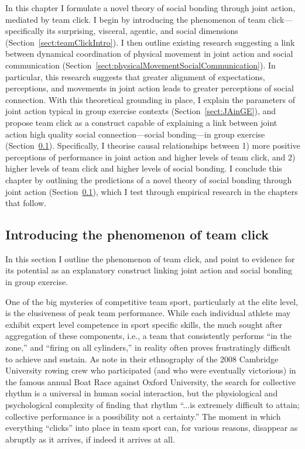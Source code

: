 \begin{CJK}{UTF8}{gbsn}
In this chapter I formulate a novel theory of social bonding through joint action, mediated by team click.  I begin by introducing the phenomenon of team click---specifically its surprising, visceral, agentic, and social dimensions (Section~\ref{sect:teamClickIntro}).  I then outline existing research suggesting a link between dynamical coordination of physical movement in joint action and social communication (Section~\ref{sect:physicalMovementSocialCommunication}). In particular, this research suggests that greater alignment of expectations, perceptions, and movements in joint action leads to greater perceptions of social connection.  With this theoretical grounding in place, I explain the parameters of joint action typical in group exercise contexts (Section~\ref{sect:JAinGE}), and propose team click as a construct capable of explaining a link between joint action high quality social connection---social bonding---in group exercise (Section~\ref{}).  Specifically, I theorise causal relationships between 1) more positive perceptions of performance in joint action and higher levels of team click, and 2) higher levels of team click and higher levels of social bonding.  I conclude this chapter by outlining the predictions of a novel theory of social bonding through joint action (Section~\ref{}), which I test through empirical research in the chapters that follow.


\subsection{Introducing the phenomenon of team click \label{sect:teamClickIntro}}
In this section I outline the phenomenon of team click, and point to evidence for its potential as an explanatory construct linking joint action and social bonding in group exercise.

One of the big mysteries of competitive team sport, particularly at the elite level, is the elusiveness of peak team performance.  While each individual athlete may exhibit expert level competence in sport specific skills, the much sought after aggregation of these components, i.e., a team that consistently performs ``in the zone,'' and ``firing on all cylinders,'' in reality often proves frustratingly difficult to achieve and sustain.  As \textcite[568]{King2011} note in their ethnography of the 2008 Cambridge University rowing crew who participated (and who were eventually victorious) in the famous annual Boat Race against Oxford University, the search for collective rhythm is a universal in human social interaction, but  the physiological and psychological complexity of finding that rhythm ``...is extremely difficult to attain; collective performance is a possibility not a certainty.''   The moment in which everything ``clicks'' into place in team sport can, for various reasons, disappear as abruptly as it arrives, if indeed it arrives at all.


\end{CJK}
